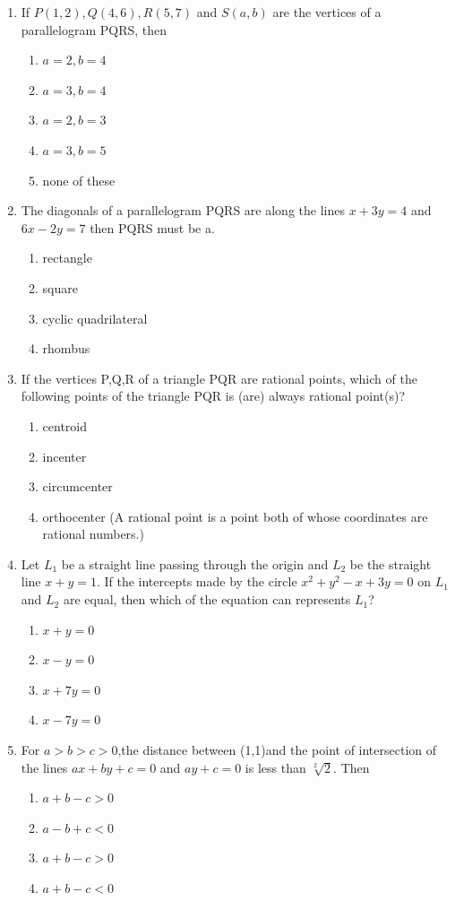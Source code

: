 \documentclass[12pt]{article}
\begin{document}
\begin{enumerate}
\begin{enumerate}
\end{enumerate}
\item  If $P(1,2),Q(4,6),R(5,7)$ and $S(a,b)$ are the vertices of a parallelogram PQRS, then
\begin{enumerate}
\item $a=2,b=4$
\item $a=3,b=4$ 
\item $a=2,b=3$
\item $a=3,b=5$
\item none of these
\end{enumerate}
\item The diagonals of a parallelogram PQRS are along the lines $x+3y=4$ and $6x-2y=7$ then PQRS must be a.
\begin{enumerate}
\item rectangle
\item square
\item cyclic quadrilateral
\item rhombus
\end{enumerate}
\item If the vertices P,Q,R of a triangle PQR are rational points, which of the following points of the triangle PQR is (are) always rational point(s)?
\begin{enumerate}
\item centroid 
\item  incenter
\item circumcenter 
\item orthocenter
(A rational point is a point both of whose coordinates are rational numbers.)
\end{enumerate}
\item  Let $L_1$ be a straight line passing through the origin and $L_2$ be the straight line $x+y=1$. If the intercepts made by the circle $x^2+y^2-x+3y=0$ on $L_1$ and $L_2$ are equal, then which of the equation can represents $L_1$?
\begin{enumerate}
\item $x+y=0$   
\item $x-y=0$ 
\item $x+7y=0$  
\item $x-7y=0$
\end{enumerate}
\item  For $a>b>c>0$,the distance between (1,1)and the point of intersection of the lines $ax+by+c=0$ and $ay+c=0$ is less than $\sqrt[2]{2}$. Then
\begin{enumerate}
\item $a+b-c>0$ 
\item $a-b+c<0$
\item $a+b-c>0$
\item $a+b-c<0$
\end{enumerate}

\end{enumerate}
\end{document}
